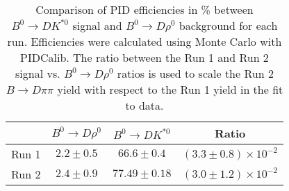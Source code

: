\begin{table}
    \centering
    \begin{tabular}{cccc}
        \toprule
        & $B^0 \to D\rho^0$ & $B^0 \to DK^{*0}$ & Ratio \\
        \midrule
Run 1 & $2.2 \pm 0.5$ & $66.6 \pm 0.4$ & $(3.3 \pm 0.8) \times 10^{-2}$ \\
Run 2 & $2.4 \pm 0.9$ & $77.49 \pm 0.18$ & $(3.0 \pm 1.2) \times 10^{-2}$ \\
      \bottomrule
        \end{tabular}
        \caption{Comparison of PID efficiencies in \% between $B^0 \to DK^{*0}$ signal and $B^0 \to D\rho^0$ background for each run. Efficiencies were calculated using Monte Carlo with PIDCalib. The ratio between the Run 1 and Run 2 signal vs. $B^0 \to D\rho^0$ ratios is used to scale the Run 2 $B \to D\pi\pi$ yield with respect to the Run 1 yield in the fit to data.}
\label{tab:rho_PID_eff}
\end{table}
